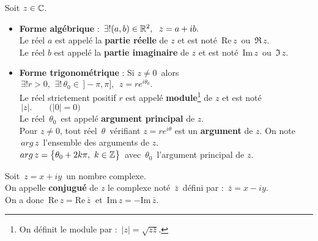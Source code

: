 Soit \(z\in \mathbb{C}\).\vspace{-0.1cm}
\begin{itemize}[leftmargin=0cm,label=•]
    \item \textbf{Forme algébrique} : \(\,\exists !(a,b)\in \mathbb{R}^2,\ \; z=a+ib.\)\vspace{0.1cm}\\
    Le réel $a$ est appelé la \textbf{partie réelle} de $z$ et est noté\, Re$\,z\,$ ou \(\,\Re\, z\).\\
    Le réel $b$ est appelé la \textbf{partie imaginaire} de $z$ et est noté\, Im$\,z\,$ ou \(\,\Im\, z.\)\vspace{0.2cm}

    \item \textbf{Forme trigonométrique} : Si \(z\neq 0\,\) alors \(\displaystyle\,\exists ! r>0, \ \,\exists !\, \theta_0 \in\, ]-\pi,\pi], \ \ z=re^{i\theta_0}.\)\vspace{0.1cm}\\
    Le réel strictement positif $r$ est appelé \textbf{module}\footnote{On définit le module par : \(\,|z|=\sqrt{z\bar{z}}\).} de $z$ et est noté \(\,|z|.\qquad \bigl(|0|=0\bigr)\)\\
    Le réel $\,\theta_0\,$ est appelé \textbf{argument principal} de $z$.\vspace{0.1cm}\\
    Pour $z\neq 0$, tout réel $\,\theta\,$ vérifiant \(z=re^{i\theta}\) est un \textbf{argument} de $z$. On note \(\,arg\,z\,\) l'ensemble des arguments de $z$.\vspace{0.1cm}\\
    \(arg\,z=\bigl\{\theta_0+2k\pi, \ k\in \mathbb{Z}\bigr\}\,\) avec \(\,\theta_0\,\) l'argument principal de $z$.
\end{itemize}

\vspace{1cm}

Soit \(\,z=x+iy\,\) un nombre complexe.\vspace{0.1cm}\\
On appelle \textbf{conjugué} de $z$ le complexe noté \(\,\bar{z} \,\) défini par : \(\,\bar{z}=x-iy.\)\vspace{0.1cm}\\
On a donc \(\,\text{Re}\,z=\text{Re}\,\bar{z}\:\) et \(\,\text{Im}\,z=-\text{Im}\,\bar{z}.\)

